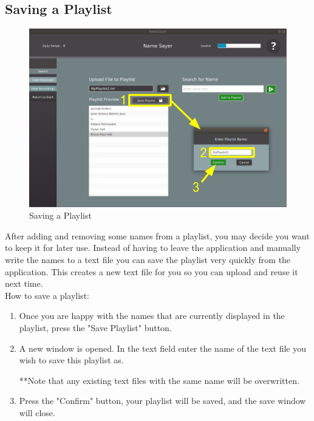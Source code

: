 \documentclass[a4paper,12pt]{article}
\begin{document}
\subsection{Saving a Playlist}
\begin{figure}[!h]
	\includegraphics[width=\linewidth]{saving.png}
	\caption{Saving a Playlist}
\end{figure}
After adding and removing some names from a playlist, you may decide you want to keep it for later use. Instead of having to leave the application and manually write the names to a text file you can save the playlist very quickly from the application. This creates a new text file for you so you can upload and reuse it next time. 
\\


How to save a playlist:


\begin{enumerate}[label=\textbf{\arabic*}]
	\item Once you are happy with the names that are currently displayed in the playlist, press the "Save Playlist" button. 
	
	\item A new window is opened. In the text field enter the name of the text file you wish to save this playlist as. 
	
	**Note that any existing text files with the same name will be overwritten. 
	
	\item Press the "Confirm" button, your playlist will be saved, and the save window will close.
\end{enumerate}
\newpage
\end{document}
